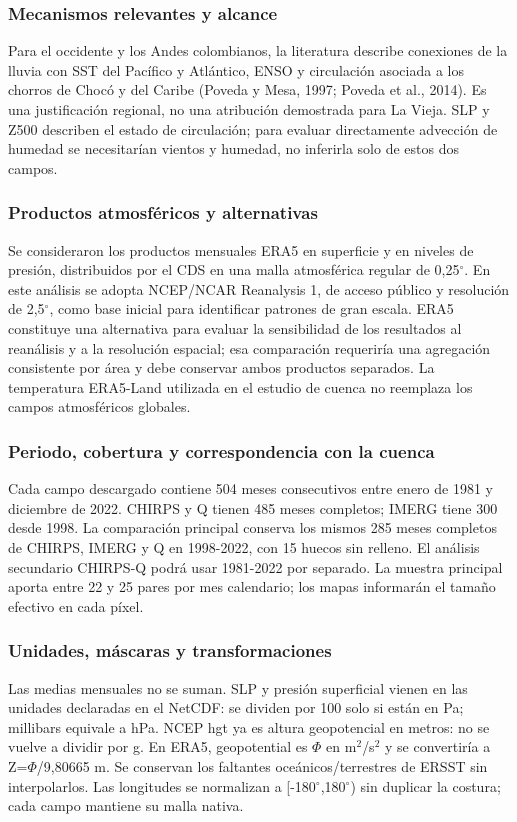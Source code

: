 \documentclass[10pt,a4paper]{article}
\begin{document}
\subsubsection*{Mecanismos relevantes y alcance}
Para el occidente y los Andes colombianos, la literatura describe conexiones de la lluvia con SST del Pacífico y Atlántico, ENSO y circulación asociada a los chorros de Chocó y del Caribe (Poveda y Mesa, 1997; Poveda et al., 2014). Es una justificación regional, no una atribución demostrada para La Vieja. SLP y Z500 describen el estado de circulación; para evaluar directamente advección de humedad se necesitarían vientos y humedad, no inferirla solo de estos dos campos.

\subsubsection*{Productos atmosféricos y alternativas}
Se consideraron los productos mensuales ERA5 en superficie y en niveles de presión, distribuidos por el CDS en una malla atmosférica regular de 0,25$^\circ$. En este análisis se adopta NCEP/NCAR Reanalysis 1, de acceso público y resolución de 2,5$^\circ$, como base inicial para identificar patrones de gran escala. ERA5 constituye una alternativa para evaluar la sensibilidad de los resultados al reanálisis y a la resolución espacial; esa comparación requeriría una agregación consistente por área y debe conservar ambos productos separados. La temperatura ERA5-Land utilizada en el estudio de cuenca no reemplaza los campos atmosféricos globales.

\subsubsection*{Periodo, cobertura y correspondencia con la cuenca}
Cada campo descargado contiene 504 meses consecutivos entre enero de 1981 y diciembre de 2022. CHIRPS y Q tienen 485 meses completos; IMERG tiene 300 desde 1998. La comparación principal conserva los mismos 285 meses completos de CHIRPS, IMERG y Q en 1998-2022, con 15 huecos sin relleno. El análisis secundario CHIRPS-Q podrá usar 1981-2022 por separado. La muestra principal aporta entre 22 y 25 pares por mes calendario; los mapas informarán el tamaño efectivo en cada píxel.

\subsubsection*{Unidades, máscaras y transformaciones}
Las medias mensuales no se suman. SLP y presión superficial vienen en las unidades declaradas en el NetCDF: se dividen por 100 solo si están en Pa; millibars equivale a hPa. NCEP hgt ya es altura geopotencial en metros: no se vuelve a dividir por g. En ERA5, geopotential es $\Phi$ en m$^2$/s$^2$ y se convertiría a Z=$\Phi$/9,80665 m. Se conservan los faltantes oceánicos/terrestres de ERSST sin interpolarlos. Las longitudes se normalizan a [-180$^\circ$,180$^\circ$) sin duplicar la costura; cada campo mantiene su malla nativa.
\end{document}
